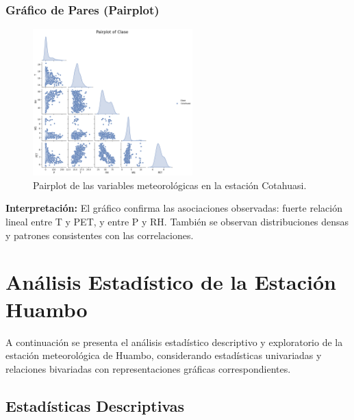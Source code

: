 \subsubsection*{Gráfico de Pares (Pairplot)}
\begin{figure}[H]
\centering
\includegraphics[width=0.55\textwidth]{resultados/por_estacion_meteorologica/Cotahuasi/pairplot.png}
\caption{Pairplot de las variables meteorológicas en la estación Cotahuasi.}
\label{fig:cotahuasi_pairplot}
\end{figure}
\textbf{Interpretación:} El gráfico confirma las asociaciones observadas: fuerte relación lineal entre T y PET, y entre P y RH. También se observan distribuciones densas y patrones consistentes con las correlaciones.




\section{Análisis Estadístico de la Estación Huambo}

A continuación se presenta el análisis estadístico descriptivo y exploratorio de la estación meteorológica de Huambo, considerando estadísticas univariadas y relaciones bivariadas con representaciones gráficas correspondientes.

\subsection{Estadísticas Descriptivas}

